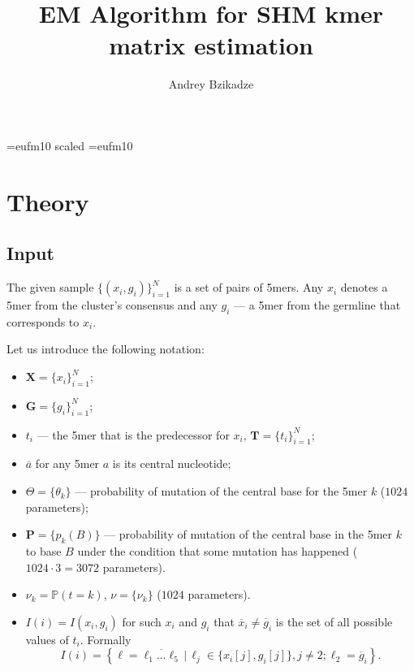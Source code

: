 \documentclass[10pt]{article}
\title{EM Algorithm for SHM kmer matrix estimation}
\author{Andrey Bzikadze}
\date{}
\begin{document}
\voffset=-20mm
\hoffset=-17mm
\font\Got=eufm10 scaled \font\Got=eufm10

\renewcommand{\vec}[1]{\boldsymbol{#1}}
\newcommand{\tr}[1]{\text{tr}{#1}}
\newcommand\cond[1][]{\:#1\vert\:}

\maketitle

\section{Theory}
\subsection{Input}

The given sample $\{(x_i, g_i)\}_{i=1}^N$ is a set of pairs of 5mers.
Any $x_i$ denotes a 5mer from the cluster's consensus and
any $g_i$ --- a 5mer from the germline that corresponds to $x_i$.

Let us introduce the following notation:
\begin{itemize}
    \item $\mathbf X = \{x_i\}_{i=1}^N$;
    \item $\mathbf G = \{g_i\}_{i=1}^N$;
    \item $t_i$ --- the 5mer that is the predecessor for $x_i$, $\mathbf T = \{t_i\}_{i=1}^N$;
    \item $\overline a$ for any 5mer $a$ is its central nucleotide;
    \item $\Theta = \{\theta_k\}$ --- probability of mutation of the central base 
          for the 5mer $k$ ($1024$ parameters);
    \item $\mathbf P = \{p_k(B)\}$ --- 
          probability of mutation of the central base in the 5mer $k$ to base $B$ under the condition that
          some mutation has happened ($1024 \cdot 3 = 3072$ parameters).
    \item $\nu_k = \mathbb P(t = k)$, $\nu = \{\nu_k\}$ ($1024$ parameters).
    \item $I(i) = I(x_i, g_i)$ for such $x_i$ and $g_i$ that $\overline x_i \neq \overline g_i$
          is the set of all possible values of $t_i$.
          Formally 
          $$I(i) = \left\{\ell = \overline{\ell_1 \ldots \ell_5} \,|\, 
                          \ell_j \in \{x_i[j], g_i[j]\}, j \neq 2; \ell_2 = \overline g_i\right\}.$$
\end{itemize}
\end{document}
